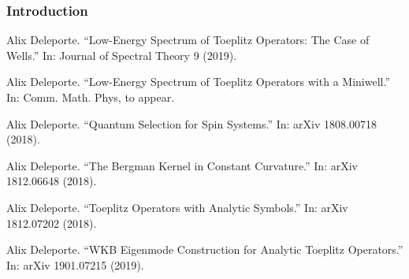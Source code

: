 \documentclass[mathserif]{beamer}
\begin{document}
      \begin{frame}
        \frametitle{Introduction}
        {\footnotesize
        \begin{description}
        \item<1>[{[D. 2019a]}] Alix Deleporte. “Low-Energy Spectrum of Toeplitz Operators: The Case
of Wells.” In: Journal of Spectral Theory 9 (2019).
\item<1-2> [{[D. 2019b]}] Alix Deleporte. “Low-Energy Spectrum of Toeplitz Operators with a
Miniwell.” In: Comm. Math. Phys, to appear.
\item<1>[{[D. 2018a++]}] Alix Deleporte. “Quantum Selection for Spin Systems.” In: arXiv
1808.00718 (2018).
\item<1>[{[D. 2018b++]}] Alix Deleporte. “The Bergman Kernel in Constant Curvature.” In:
arXiv 1812.06648 (2018).
\item<1>[{[D. 2018c++]}] Alix Deleporte. “Toeplitz Operators with Analytic Symbols.” In: arXiv
1812.07202 (2018).
\item<1>[{[D. 2019++]}] Alix Deleporte. “WKB Eigenmode Construction for Analytic Toeplitz
  Operators.” In: arXiv 1901.07215 (2019).
        \end{description}}
      \end{frame}

      
\end{document}

